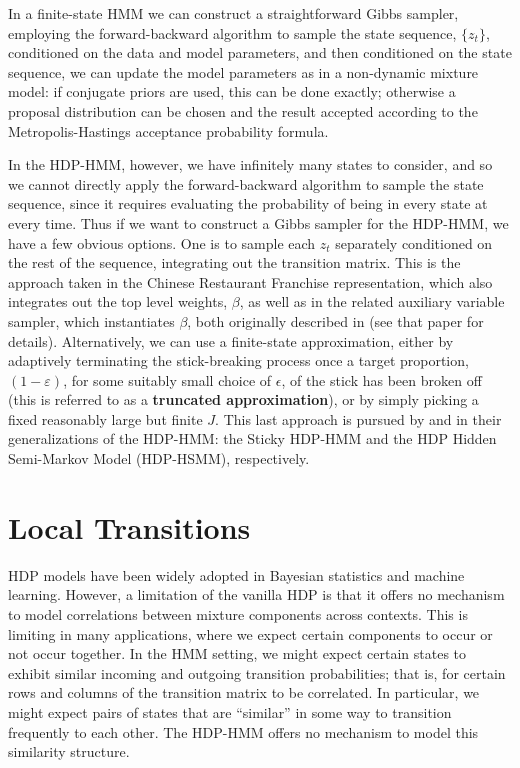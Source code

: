 In a finite-state HMM we can construct a straightforward Gibbs
sampler, employing the forward-backward algorithm to
sample the state sequence, $\{z_{t}\}$, conditioned on the data and
model parameters, and then conditioned on the state sequence, we can
update the model parameters as in a non-dynamic mixture model: if
conjugate priors are used, this can be done exactly; otherwise a
proposal distribution can be chosen and the result accepted according
to the Metropolis-Hastings acceptance probability formula.

In the HDP-HMM, however, we have infinitely many states to consider,
and so we cannot directly apply the forward-backward algorithm to
sample the state sequence, since it requires evaluating the
probability of being in every state at every time.  Thus if we want to
construct a Gibbs sampler for the HDP-HMM, we have a few obvious
options.  One is to sample each $z_t$ separately conditioned on the
rest of the sequence, integrating out the transition matrix.  
This is the approach taken in the Chinese
Restaurant Franchise representation, which also integrates out the top
level weights, $\beta$, as well as in the related auxiliary
variable sampler, which instantiates $\beta$, both originally described 
in \citet{teh2006hierarchical} (see that paper for details).  
Alternatively, we can use a finite-state approximation, either by
adaptively terminating the stick-breaking process once a target
proportion, $(1 - \varepsilon)$, for some suitably small choice of
$\epsilon$, of the stick has been broken off (this is referred to as a
{\bf truncated approximation}), or by simply picking a fixed reasonably
large but finite $J$.  This last approach is pursued by
\cite{fox2008hdp} and \cite{johnson2013bayesian} in their
generalizations of the HDP-HMM: the Sticky HDP-HMM and the HDP Hidden
Semi-Markov Model (HDP-HSMM), respectively.

\section{Local Transitions}
\label{sec:local-transitions}

HDP models have been widely adopted in Bayesian statistics and
machine learning.  However, a limitation of the vanilla HDP
is that it offers no mechanism to model correlations between mixture
components across contexts.  %
This is limiting in many applications, where we expect certain 
components to occur or not occur together.  In the HMM setting, 
we might expect certain states to exhibit similar incoming and
outgoing transition probabilities; that is, for certain rows and columns of the transition
matrix to be correlated.  In particular, we might expect pairs of states that are
``similar'' in some way to transition frequently to each other.  The
HDP-HMM offers no mechanism to model this similarity structure.  

